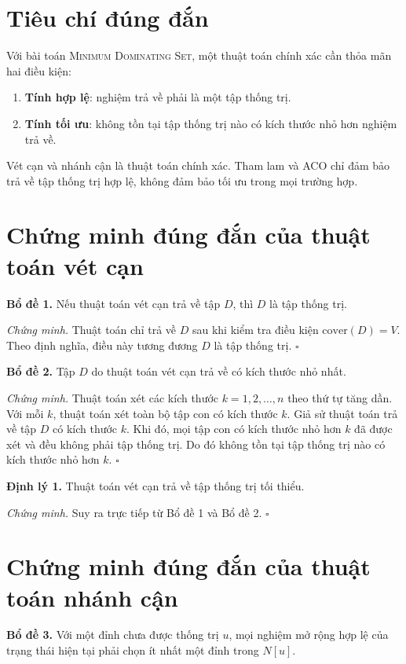 \documentclass[12pt, a4paper]{report}
\newcommand{\MDS}{\textsc{Minimum Dominating Set}}
\begin{document}
\section{Tiêu chí đúng đắn}

Với bài toán \MDS{}, một thuật toán chính xác cần thỏa mãn hai điều kiện:

\begin{enumerate}[leftmargin=*, label=\arabic*.]
  \item \textbf{Tính hợp lệ}: nghiệm trả về phải là một tập thống trị.
  \item \textbf{Tính tối ưu}: không tồn tại tập thống trị nào có kích thước nhỏ hơn nghiệm trả về.
\end{enumerate}

Vét cạn và nhánh cận là thuật toán chính xác. Tham lam và ACO chỉ đảm bảo trả về tập thống trị hợp lệ,
không đảm bảo tối ưu trong mọi trường hợp.

\section{Chứng minh đúng đắn của thuật toán vét cạn}

\textbf{Bổ đề 1.} Nếu thuật toán vét cạn trả về tập $D$, thì $D$ là tập thống trị.

\textit{Chứng minh.} Thuật toán chỉ trả về $D$ sau khi kiểm tra điều kiện $\mathrm{cover}(D)=V$.
Theo định nghĩa, điều này tương đương $D$ là tập thống trị. \hfill $\square$

\textbf{Bổ đề 2.} Tập $D$ do thuật toán vét cạn trả về có kích thước nhỏ nhất.

\textit{Chứng minh.} Thuật toán xét các kích thước $k=1,2,\ldots,n$ theo thứ tự tăng dần. Với mỗi $k$,
thuật toán xét toàn bộ tập con có kích thước $k$. Giả sử thuật toán trả về tập $D$ có kích thước $k$.
Khi đó, mọi tập con có kích thước nhỏ hơn $k$ đã được xét và đều không phải tập thống trị. Do đó không
tồn tại tập thống trị nào có kích thước nhỏ hơn $k$. \hfill $\square$

\textbf{Định lý 1.} Thuật toán vét cạn trả về tập thống trị tối thiểu.

\textit{Chứng minh.} Suy ra trực tiếp từ Bổ đề 1 và Bổ đề 2. \hfill $\square$

\section{Chứng minh đúng đắn của thuật toán nhánh cận}

\textbf{Bổ đề 3.} Với một đỉnh chưa được thống trị $u$, mọi nghiệm mở rộng hợp lệ của trạng thái hiện
tại phải chọn ít nhất một đỉnh trong $N[u]$.
\end{document}
